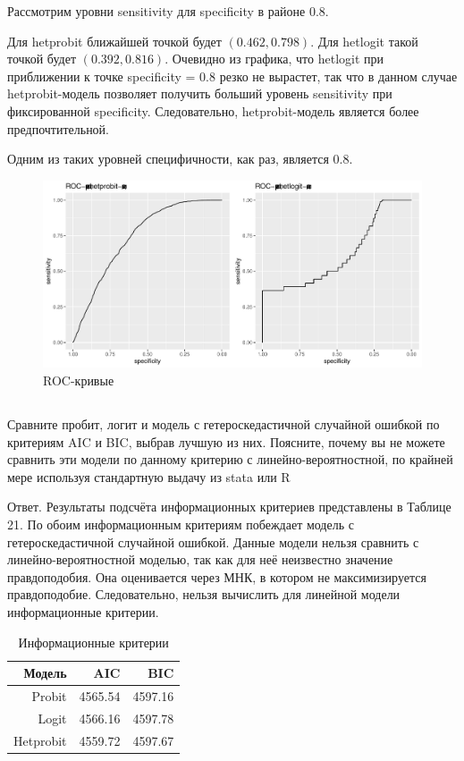 \documentclass[a4paper,12pt]{article}
\begin{document}
Рассмотрим уровни sensitivity для specificity в районе 0.8. 

Для hetprobit ближайшей точкой будет $ (0.462, 0.798) $. Для hetlogit такой точкой будет $ (0.392, 0.816) $. Очевидно из графика, что hetlogit при приближении к точке specificity = $ 0.8 $ резко не вырастет, так что в данном случае hetprobit-модель позволяет получить больший уровень sensitivity при фиксированной specificity. Следовательно, hetprobit-модель является более предпочтительной. 

Одним из таких уровней специфичности, как раз, является 0.8.





\begin{figure}[!h]
	\includegraphics[width=\linewidth]{roc_curves}
	\caption{ ROC-кривые \label{roc}}
\end{figure}

\subsection{}
\Sun Сравните пробит, логит и модель с гетероскедастичной случайной ошибкой по
критериям AIC и BIC, выбрав лучшую из них. Поясните, почему вы не можете сравнить
эти модели по данному критерию с линейно-вероятностной, по крайней мере используя
стандартную выдачу из stata или R

Ответ. Результаты подсчёта информационных критериев представлены в Таблице 21. По обоим информационным критериям побеждает модель с гетероскедастичной случайной ошибкой.  Данные модели нельзя сравнить с линейно-вероятностной моделью, так как для неё неизвестно значение правдоподобия. Она оценивается через МНК, в котором не максимизируется правдоподобие. Следовательно, нельзя вычислить для линейной модели информационные критерии.
\begin{table}[ht]
	\centering
	\begin{tabular}{|rrr|}
		\hline
		Модель & AIC & BIC \\ 
		\hline
		Probit & 4565.54 & 4597.16 \\ 
		Logit & 4566.16 & 4597.78 \\ 
		Hetprobit & 4559.72 & 4597.67 \\ 
		\hline
	\end{tabular}
\caption{Информационные критерии}
\end{table}
\end{document}
